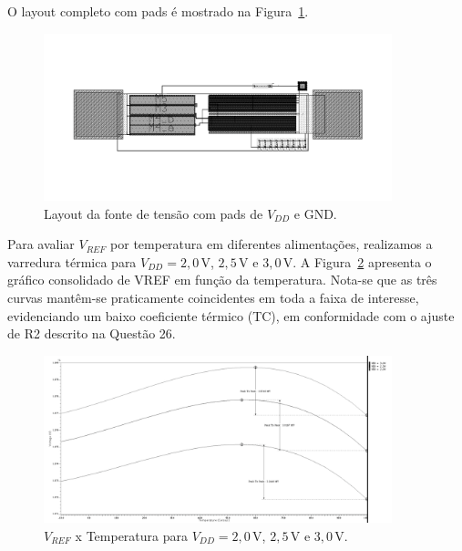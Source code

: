 \documentclass[12pt,a4paper]{article}
\begin{document}
O layout completo com pads é mostrado na Figura~\ref{fig:q27_layout}.

\begin{figure}[H]
    \centering
    \includegraphics[width=0.9\textwidth]{images/layout27.png}
    \caption{Layout da fonte de tensão com pads de $V_{DD}$ e GND.}
    \label{fig:q27_layout}
\end{figure}

Para avaliar $V_{REF}$ por temperatura em diferentes alimentações, realizamos a varredura térmica para $V_{DD}=2{,}0$\,V, $2{,}5$\,V e $3{,}0$\,V. A Figura~\ref{fig:q27_vref_temp} apresenta o gráfico consolidado de VREF em função da temperatura. Nota-se que as três curvas mantêm-se praticamente coincidentes em toda a faixa de interesse, evidenciando um baixo coeficiente térmico (TC), em conformidade com o ajuste de R2 descrito na Questão 26.

\begin{figure}[H]
    \centering
    \includegraphics[width=0.9\textwidth]{images/curvas27.png}
    \caption{$V_{REF}$ x Temperatura para $V_{DD}=2{,}0$\,V, $2{,}5$\,V e $3{,}0$\,V.}
    \label{fig:q27_vref_temp}
\end{figure}
\end{document}
